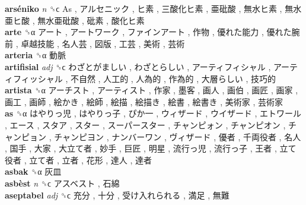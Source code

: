 \textbf{arséniko} \emph{n}  ␝ϲ   As ,  アルセニック ,  ヒ素 ,  三酸化ヒ素 ,  亜砒酸 ,  無水ヒ素 ,  無水亜ヒ酸 ,  無水亜砒酸 ,  砒素 ,  酸化ヒ素   \\
\textbf{arte} ␝α   アート ,  アートワーク ,  ファインアート ,  作物 ,  優れた能力 ,  優れた腕前 ,  卓越技能 ,  名人芸 ,  図版 ,  工芸 ,  美術 ,  芸術   \\
\textbf{arteria} ␝α   動脈   \\
\textbf{artifisial} \emph{adj}  ␝ϲ   わざとがましい ,  わざとらしい ,  アーティフィシャル ,  アーティフィッシャル ,  不自然 ,  人工的 ,  人為的 ,  作為的 ,  大層らしい ,  技巧的   \\
\textbf{artista} ␝α   アーチスト ,  アーティスト ,  作家 ,  墨客 ,  画人 ,  画伯 ,  画匠 ,  画家 ,  画工 ,  画師 ,  絵かき ,  絵師 ,  絵描 ,  絵描き ,  絵書 ,  絵書き ,  美術家 ,  芸術家   \\
\textbf{as} ␝α   はやりっ児 ,  はやりっ子 ,  ぴか一 ,  ウィザード ,  ウイザード ,  エトワール ,  エース ,  スタア ,  スター ,  スーパースター ,  チャンピォン ,  チャンピオン ,  チャンピョン ,  チャンピヨン ,  ナンバーワン ,  ヴィザード ,  優者 ,  千両役者 ,  名人 ,  国手 ,  大家 ,  大立て者 ,  妙手 ,  巨匠 ,  明星 ,  流行っ児 ,  流行っ子 ,  王者 ,  立て役者 ,  立て者 ,  立者 ,  花形 ,  達人 ,  達者   \\
\textbf{asbak} ␝α   灰皿   \\
\textbf{asbèst} \emph{n}  ␝ϲ   アスベスト ,  石綿   \\
\textbf{aseptabel} \emph{adj}  ␝ϲ   充分 ,  十分 ,  受け入れられる ,  満足 ,  無難   \\
